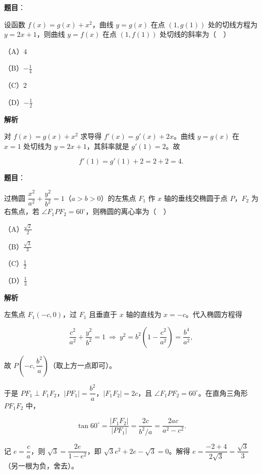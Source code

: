 \begin{answer}

\textbf{题目}：

设函数 $f(x)=g(x)+x^2$，曲线 $y=g(x)$ 在点 $(1,g(1))$ 处的切线方程为 $y=2x+1$，则曲线 $y=f(x)$ 在点 $(1,f(1))$ 处切线的斜率为（　）

（A）$4$

（B）$-\frac14$

（C）$2$

（D）$-\frac12$

\textbf{解析}

对 $f(x)=g(x)+x^2$ 求导得 $f'(x)=g'(x)+2x$。曲线 $y=g(x)$ 在 $x=1$ 处切线为 $y=2x+1$，其斜率就是 $g'(1)=2$。故

\nopagebreak[4]
\[f'(1)=g'(1)+2=2+2=4.\]


\end{answer}
\begin{answer}

\textbf{题目}：

过椭圆 $\dfrac{x^2}{a^2}+\dfrac{y^2}{b^2}=1$（$a>b>0$）的左焦点 $F_1$ 作 $x$ 轴的垂线交椭圆于点 $P$，$F_2$ 为右焦点，若 $\angle F_1PF_2=60^\circ$，则椭圆的离心率为（　）

（A）$\frac{\sqrt2}{2}$

（B）$\frac{\sqrt3}{3}$

（C）$\frac12$

（D）$\frac13$

\textbf{解析}

左焦点 $F_1(-c,0)$，过 $F_1$ 且垂直于 $x$ 轴的直线为 $x=-c$。代入椭圆方程得

\nopagebreak[4]
\[\frac{c^2}{a^2}+\frac{y^2}{b^2}=1\ \Longrightarrow\ y^2=b^2\left(1-\frac{c^2}{a^2}\right)=\frac{b^4}{a^2},\]

故 $P\left(-c,\dfrac{b^2}{a}\right)$（取上方一点即可）。

于是 $PF_1\perp F_1F_2$，$|PF_1|=\dfrac{b^2}{a}$，$|F_1F_2|=2c$，且 $\angle F_1PF_2=60^\circ$。在直角三角形 $PF_1F_2$ 中，

\nopagebreak[4]
\[\tan60^\circ=\frac{|F_1F_2|}{|PF_1|}=\frac{2c}{b^2/a}=\frac{2ac}{a^2-c^2}.\]

记 $e=\dfrac ca$，则 $\sqrt3=\dfrac{2e}{1-e^2}$，即 $\sqrt3e^2+2e-\sqrt3=0$。解得 $e=\dfrac{-2+4}{2\sqrt3}=\dfrac{\sqrt3}{3}$（另一根为负，舍去）。


\end{answer}
